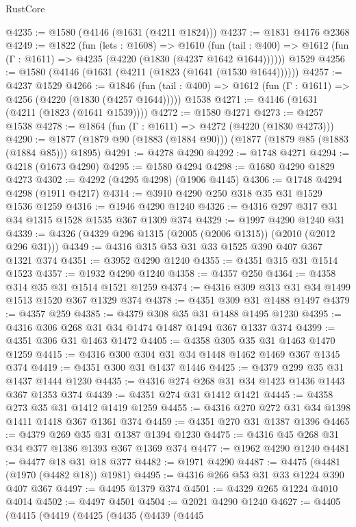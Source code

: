 \begin{lexlean}{RustCore}
\begin{coremodule}
@4235 := @1580 (@4146 (@1631 (@4211 @1824)))
@4237 := @1831 @4176 @2368
@4249 := @1822
    (fun (lets : @1608) =>
    @1610
      (fun (tail : @400) => @1612 (fun (Γ : @1611) => @4235 (@4220 (@1830 (@4237 @1642 @1644))))))
    @1529
@4256 := @1580 (@4146 (@1631 (@4211 (@1823 (@1641 (@1530 @1644))))))
@4257 := @4237 @1529
@4266 := @1846
    (fun (tail : @400) => @1612 (fun (Γ : @1611) => @4256 (@4220 (@1830 (@4257 @1644)))))
    @1538
@4271 := @4146 (@1631 (@4211 (@1823 (@1641 @1539))))
@4272 := @1580 @4271
@4273 := @4257 @1538
@4278 := @1864 (fun (Γ : @1611) => @4272 (@4220 (@1830 @4273)))
@4290 := @1877 (@1879 @90 (@1883 (@1884 @90))) (@1877 (@1879 @85 (@1883 (@1884 @85))) @1895)
@4291 := @4278 @4290
@4292 := @1748 @4271
@4294 := @4218 (@1673 @4290)
@4295 := @1580 @4294
@4298 := @1680 @4290 @1829 @4273
@4302 := @4292 (@4295 @4298) (@1906 @4145)
@4306 := @1748 @4294 @4298 (@1911 @4217)
@4314 := @3910 @4290 @250 @318 @35 @31 @1529 @1536 @1259
@4316 := @1946 @4290 @1240
@4326 := @4316 @297 @317 @31 @34 @1315 @1528 @1535 @367 @1309 @374
@4329 := @1997 @4290 @1240 @31
@4339 := @4326 (@4329 @296 @1315 (@2005 (@2006 @1315)) (@2010 (@2012 @296 @31)))
@4349 := @4316 @315 @53 @31 @33 @1525 @390 @407 @367 @1321 @374
@4351 := @3952 @4290 @1240
@4355 := @4351 @315 @31 @1514 @1523
@4357 := @1932 @4290 @1240
@4358 := @4357 @250
@4364 := @4358 @314 @35 @31 @1514 @1521 @1259
@4374 := @4316 @309 @313 @31 @34 @1499 @1513 @1520 @367 @1329 @374
@4378 := @4351 @309 @31 @1488 @1497
@4379 := @4357 @259
@4385 := @4379 @308 @35 @31 @1488 @1495 @1230
@4395 := @4316 @306 @268 @31 @34 @1474 @1487 @1494 @367 @1337 @374
@4399 := @4351 @306 @31 @1463 @1472
@4405 := @4358 @305 @35 @31 @1463 @1470 @1259
@4415 := @4316 @300 @304 @31 @34 @1448 @1462 @1469 @367 @1345 @374
@4419 := @4351 @300 @31 @1437 @1446
@4425 := @4379 @299 @35 @31 @1437 @1444 @1230
@4435 := @4316 @274 @268 @31 @34 @1423 @1436 @1443 @367 @1353 @374
@4439 := @4351 @274 @31 @1412 @1421
@4445 := @4358 @273 @35 @31 @1412 @1419 @1259
@4455 := @4316 @270 @272 @31 @34 @1398 @1411 @1418 @367 @1361 @374
@4459 := @4351 @270 @31 @1387 @1396
@4465 := @4379 @269 @35 @31 @1387 @1394 @1230
@4475 := @4316 @45 @268 @31 @34 @377 @1386 @1393 @367 @1369 @374
@4477 := @1962 @4290 @1240
@4481 := @4477 @18 @31 @18 @377
@4482 := @1971 @4290
@4487 := @4475 (@4481 (@1970 (@4482 @18)) @1981)
@4495 := @4316 @266 @53 @31 @33 @1224 @390 @407 @367
@4497 := @4495 @1379 @374
@4501 := @4329 @265 @1224 @4010 @4014
@4502 := @4497 @4501
@4504 := @2021 @4290 @1240
@4627 := @4405
    (@4415
      (@4419
        (@4425
          (@4435
            (@4439
              (@4445

\end{coremodule}
\end{lexlean}
